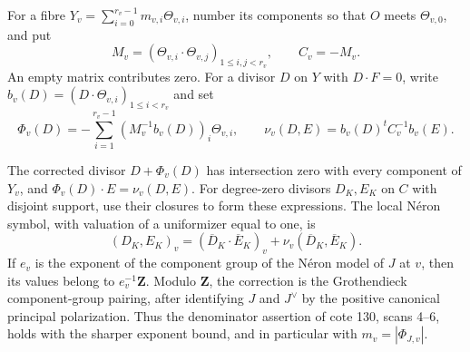 For a fibre $Y_v=\sum_{i=0}^{r_v-1}m_{v,i}\Theta_{v,i}$, number its
components so that $O$ meets $\Theta_{v,0}$, and put
\[
 M_v=(\Theta_{v,i}\cdot\Theta_{v,j})_{1\leq i,j<r_v},\qquad
 C_v=-M_v.
\]
An empty matrix contributes zero.  For a divisor $D$ on $Y$ with
$D\cdot F=0$, write
$b_v(D)=(D\cdot\Theta_{v,i})_{1\leq i<r_v}$ and set
\[
 \Phi_v(D)=-\sum_{i=1}^{r_v-1}(M_v^{-1}b_v(D))_i\Theta_{v,i},
 \qquad
 \nu_v(D,E)=b_v(D)^tC_v^{-1}b_v(E).
\]

\begin{proposition}
\label{D:local}
The corrected divisor $D+\Phi_v(D)$ has intersection zero with every
component of $Y_v$, and $\Phi_v(D)\cdot E=\nu_v(D,E)$.
For degree-zero divisors $D_K,E_K$ on $C$ with disjoint support, use their
closures to form these expressions.  The local N\'eron symbol, with
valuation of a uniformizer equal to one, is
\[
       (D_K,E_K)_v=(\overline D_K\cdot\overline E_K)_v
                          +\nu_v(\overline D_K,\overline E_K).
\]
If $e_v$ is the exponent of the component group of the N\'eron model of
$J$ at $v$, then its values belong to $e_v^{-1}\mathbf Z$.
Modulo $\mathbf Z$, the correction is the Grothendieck component-group
pairing, after identifying $J$ and $J^\vee$ by the positive canonical
principal polarization.  Thus the denominator assertion of cote 130,
scans 4--6, holds with the sharper exponent bound, and in particular
with $m_v=|\Phi_{J,v}|$.
\end{proposition}
